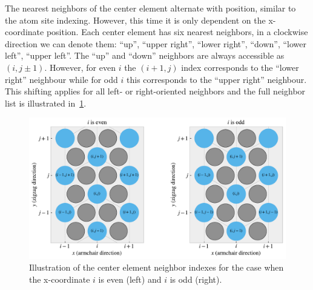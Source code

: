 The nearest neighbors of the center element alternate with position, similar to the atom site indexing. However, this time it is only dependent on the x-coordinate position. Each center element has six nearest neighbors, in a clockwise
direction we can denote them: ``up'', ``upper right'', ``lower right'',
``down'', ``lower left'', ``upper left''. The ``up'' and ``down'' neighbors are always accessible as $(i,j\pm 1)$. However, for even $i$ the $(i+1,j)$ index corresponds to the
``lower right'' neighbour while for odd $i$ this corresponds to the ``upper
right'' neighbour. This shifting applies for all left- or right-oriented neighbors and the full neighbor list is illustrated in~\cref{fig:center_directions}. 

\begin{figure}[!htb]
  \centering
  \includegraphics[width=0.70\linewidth]{figures/system/center_directions.pdf}
  \caption{Illustration of the center element neighbor indexes for the case when the x-coordinate $i$ is even (left) and $i$ is odd (right).}
  \label{fig:center_directions}
\end{figure}

